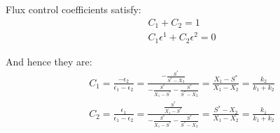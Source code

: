 \documentclass{article}
\begin{document}
Flux control coefficients satisfy:
\begin{equation}
    \label{FCC1}
    \begin{aligned}
        C_1  + C_2 = 1 \\
        C_1 \epsilon^1 + C_2 \epsilon^2 = 0
    \end{aligned}
\end{equation}

And hence they are:
\begin{equation}
    \label{FCC2}
    \begin{aligned}
        C_1  =  \frac{-\epsilon_2}{\epsilon_1-\epsilon_2} = \frac{-\frac{S^*}{S^*-X_2}}{-\frac{S^*}{X_1-S^*}-\frac{S^*}{S^*-X_2}}=\frac{X_1-S^*}{X_1-X_2} = \frac{k_2}{k_1+k_2} \\
        C_2  =  \frac{\epsilon_1}{\epsilon_1-\epsilon_2} = \frac{\frac{S^*}{X_1-S^*}}{-\frac{S^*}{X_1-S^*}-\frac{S^*}{S^*-X_2}}=\frac{S^*-X_2}{X_1-X_2} = \frac{k_1}{k_1+k_2} 
    \end{aligned}
\end{equation}

%
\end{document}

